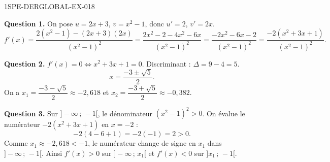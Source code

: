 \begin{corrige}{1SPE-DERGLOBAL-EX-018}

\textbf{Question 1.} On pose $u = 2x+3$, $v = x^2-1$, donc $u' = 2$, $v' = 2x$.
\[
f'(x) = \frac{2(x^2-1) - (2x+3)(2x)}{(x^2-1)^2} = \frac{2x^2-2 - 4x^2-6x}{(x^2-1)^2} = \frac{-2x^2-6x-2}{(x^2-1)^2} = \frac{-2(x^2+3x+1)}{(x^2-1)^2}.
\]

\textbf{Question 2.} $f'(x) = 0 \iff x^2+3x+1=0$. Discriminant : $\Delta = 9-4 = 5$.
\[
x = \frac{-3 \pm \sqrt{5}}{2}.
\]
On a $x_1 = \dfrac{-3-\sqrt{5}}{2} \approx -2{,}618$ et $x_2 = \dfrac{-3+\sqrt{5}}{2} \approx -0{,}382$.

\textbf{Question 3.} Sur $]-\infty\,;\,-1[$, le dénominateur $(x^2-1)^2 > 0$. On évalue le numérateur $-2(x^2+3x+1)$ en $x = -2$ :
\[
-2(4-6+1) = -2(-1) = 2 > 0.
\]
Comme $x_1 \approx -2{,}618 < -1$, le numérateur change de signe en $x_1$ dans $]-\infty\,;\,-1[$. Ainsi $f'(x) > 0$ sur $]-\infty\,;\,x_1[$ et $f'(x) < 0$ sur $]x_1\,;\,-1[$.
\end{corrige}
